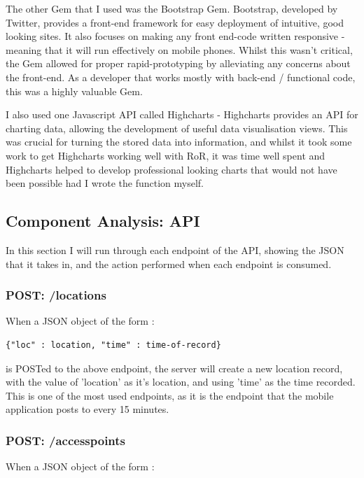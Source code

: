 \documentclass[11pt]{informatics-report}
\begin{document}
The other Gem that I used was the Bootstrap Gem. Bootstrap, developed by Twitter, provides a front-end framework for easy deployment of intuitive, good looking sites. It also focuses on making any front end-code written responsive - meaning that it will run effectively on mobile phones. Whilst this wasn't critical, the Gem allowed for proper rapid-prototyping by alleviating any concerns about the front-end. As a developer that works mostly with back-end / functional code, this was a highly valuable Gem.

I also used one Javascript API called Highcharts - Highcharts provides an API for charting data, allowing the development of useful data visualisation views. This was crucial for turning the stored data into information, and whilst it took some work to get Highcharts working well with RoR, it was time well spent and Highcharts helped to develop professional looking charts that would not have been possible had I wrote the function myself.

\subsection{Component Analysis: API}

In this section I will run through each endpoint of the API, showing the JSON that it takes in, and the action performed when each endpoint is consumed.

\subsubsection{POST: /locations}

When a JSON object of the form :

\begin{verbatim}
{"loc" : location, "time" : time-of-record}
\end{verbatim}

is POSTed to the above endpoint, the server will create a new location record, with the value of 'location' as it's location, and using 'time' as the time recorded. This is one of the most used endpoints, as it is the endpoint that the mobile application posts to every 15 minutes.

\subsubsection{POST: /accesspoints}

When a JSON object of the form :
\end{document}
